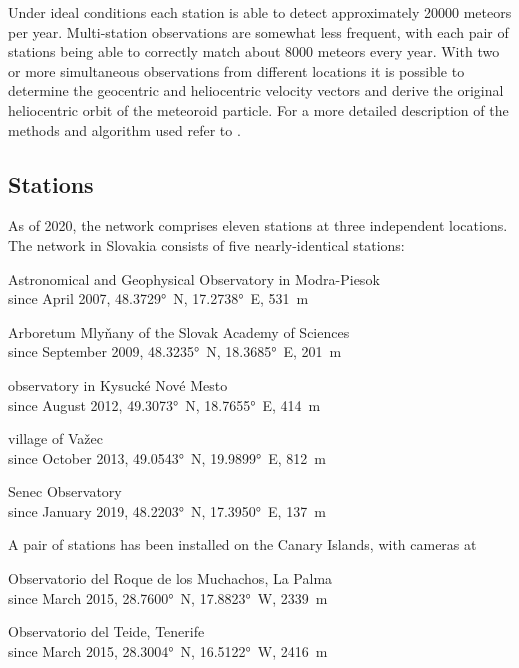         Under ideal conditions each station is able to detect approximately 20000 meteors per year.
        Multi-station observations are somewhat less frequent, with each pair of stations being able
        to correctly match about 8000 meteors every year.
        With two or more simultaneous observations from different locations it is possible to determine
        the geocentric and heliocentric velocity vectors and derive the original heliocentric orbit of the meteoroid particle.
        For a more detailed description of the methods and algorithm used refer to \citet{kornos+2015}.

    \subsection{Stations} \label{iAs}
        As of 2020, the network comprises eleven stations at three independent locations.
        The network in Slovakia consists of five nearly-identical stations:
        \begin{description}[leftmargin = 25mm]
            \item[AGO]      Astronomical and Geophysical Observatory in Modra-Piesok\\
                            since April 2007, \ang{48.3729}~N, \ang{17.2738}~E, \SI{531}{\metre}
            \item[ARBO]     Arboretum Mlyňany of the Slovak Academy of Sciences\\
                            since September 2009, \ang{48.3235}~N, \ang{18.3685}~E, \SI{201}{\metre}
            \item[KNM]      observatory in Kysucké Nové Mesto\\
                            since August 2012, \ang{49.3073}~N, \ang{18.7655}~E, \SI{414}{\metre}
            \item[VAZEC]    village of Važec\\
                            since October 2013, \ang{49.0543}~N, \ang{19.9899}~E, \SI{812}{\metre}
            \item[SENEC]    Senec Observatory\\
                            since January 2019, \ang{48.2203}~N, \ang{17.3950}~E, \SI{137}{\metre}
        \end{description}

        A pair of stations has been installed on the Canary Islands, with cameras at
        \begin{description}[leftmargin = 25mm]
            \item[LP]       Observatorio del Roque de los Muchachos, La Palma \\
                            since March 2015, \ang{28.7600}~N, \ang{17.8823}~W, \SI{2339}{\metre}
            \item[TE]       Observatorio del Teide, Tenerife \\
                            since March 2015, \ang{28.3004}~N, \ang{16.5122}~W, \SI{2416}{\metre}
        \end{description}

